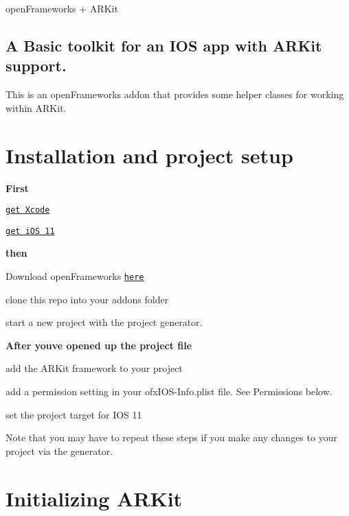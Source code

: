 open\+Frameworks + A\+R\+Kit

\subsection*{A Basic toolkit for an I\+OS app with A\+R\+Kit support.}

This is an open\+Frameworks addon that provides some helper classes for working within A\+R\+Kit.

\section*{Installation and project setup}

{\bfseries First}
\begin{DoxyItemize}
\item \href{https://developer.apple.com/xcode/}{\tt get Xcode}
\item \href{https://www.apple.com/ios/ios-11/}{\tt get i\+OS 11}
\end{DoxyItemize}

{\bfseries then}
\begin{DoxyItemize}
\item Download open\+Frameworks \href{http://openframeworks.cc/versions/v0.9.8/of_v0.9.8_ios_release.zip}{\tt here}
\item clone this repo into your addons folder
\item start a new project with the project generator.
\end{DoxyItemize}

{\bfseries After you\textquotesingle{}ve opened up the project file}
\begin{DoxyItemize}
\item add the A\+R\+Kit framework to your project
\end{DoxyItemize}




\begin{DoxyItemize}
\item add a permission setting in your {\ttfamily ofx\+I\+O\+S-\/\+Info.\+plist} file. See Permissions below.
\item set the project target for I\+OS 11 
\end{DoxyItemize}

Note that you may have to repeat these steps if you make any changes to your project via the generator.

\section*{Initializing A\+R\+Kit}

